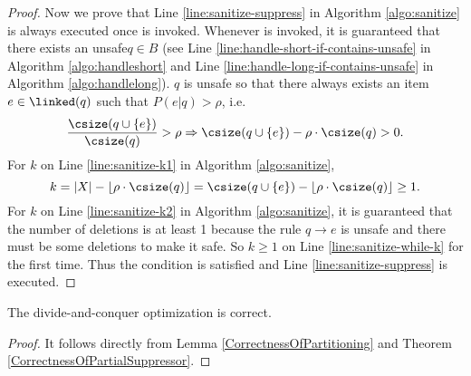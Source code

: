 \begin{proof}
Now we prove that Line \ref{line:sanitize-suppress} in Algorithm \ref{algo:sanitize}
  is always executed once \SanitizeBuffer is invoked.
Whenever \SanitizeBuffer is invoked, it is guaranteed that there exists
  an unsafe\qid $q\in B$ (see Line \ref{line:handle-short-if-contains-unsafe} in Algorithm \ref{algo:handleshort}
  and Line \ref{line:handle-long-if-contains-unsafe} in Algorithm \ref{algo:handlelong}).
$q$ is unsafe so that there always exists an item $e\in\linked(q)$ such that $P(e|q)>\rho$,
  i.e. \[ \frac{\csize(q\cup\{e\})}{\csize(q)}>\rho \Rightarrow \csize(q\cup\{e\})-\rho\cdot\csize(q)>0 .\]
For $k$ on Line \ref{line:sanitize-k1} in Algorithm \ref{algo:sanitize},
  \[ k = |X|-\lfloor\rho\cdot\csize(q)\rfloor = \csize(q\cup\{e\})-\lfloor\rho\cdot\csize(q)\rfloor \ge 1 .\]
For $k$ on Line \ref{line:sanitize-k2} in Algorithm \ref{algo:sanitize},
  it is guaranteed that the number of deletions is at least 1
  because the rule $q\rightarrow e$ is unsafe and there must be some deletions to make it safe.
So $k\ge 1$ on Line \ref{line:sanitize-while-k} for the first time.
Thus the condition is satisfied and Line \ref{line:sanitize-suppress} is executed.
\end{proof}

\begin{corollary}
The divide-and-conquer optimization \SplitData is correct.
\end{corollary}
\begin{proof}
It follows directly from Lemma \ref{CorrectnessOfPartitioning} and 
Theorem \ref{CorrectnessOfPartialSuppressor}. 
\end{proof}

